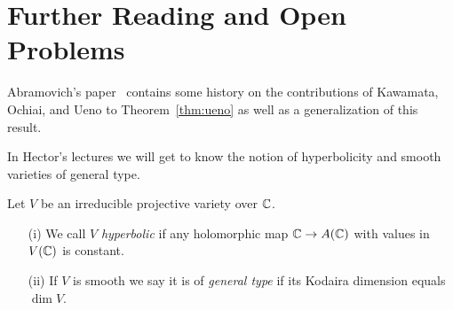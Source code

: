 \section{Further Reading and Open Problems}


Abramovich's paper~\cite{abramovich} contains some history on the
contributions of Kawamata, Ochiai, and Ueno to Theorem~\ref{thm:ueno}
as well as a generalization of this result.



In Hector's lectures we will get to know the notion of hyperbolicity
and smooth varieties of general type.

\begin{definition}
  Let $V$ be an irreducible projective variety over ${\mathbb{C}}$.
  \begin{enumerate}
  \item [(i)] We call $V$ \emph{hyperbolic} if
    any holomorphic map ${\mathbb{C}} \rightarrow A({\mathbb{C}})$ with values in
    $V({\mathbb{C}})$ is
    constant.
  \item[(ii)] If $V$ is smooth we say it is of \emph{general type} if its
    Kodaira dimension equals $\dim V$. 
  \end{enumerate}
\end{definition}

